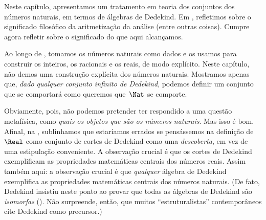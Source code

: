 \documentclass[../../../include/open-logic-section]{subfiles}
\begin{document}


Neste capítulo, apresentamos um tratamento em teoria dos conjuntos dos
números naturais, em termos de álgebras de Dedekind. Em
, refletimos sobre o significado filosófico
da aritmetização da análise (entre outras coisas).
Cumpre agora refletir sobre o significado do que aqui alcançamos.

Ao longo de , tomamos os números naturais como
dados e os usamos para construir os inteiros, os racionais e os reais,
de modo explícito. Neste capítulo, não demos uma construção explícita
dos números naturais. Mostramos apenas que,
\emph{dado qualquer conjunto infinito de Dedekind}, podemos definir um conjunto que se
comportará como queremos que~$\Nat$ se comporte.

Obviamente, pois, não podemos pretender ter respondido a uma questão
metafísica, como \emph{quais os objetos que são os números naturais}. Mas
isso é bom. Afinal, na , sublinhamos que
estaríamos errados se pensássemos na definição de
$\Real$ como conjunto de cortes de Dedekind como uma \emph{descoberta}, em vez de
uma estipulação conveniente. A observação crucial é que os cortes de Dedekind
exemplificam as propriedades matemáticas centrais dos números reais.
Assim também aqui: a observação crucial é que \emph{qualquer}
álgebra de Dedekind exemplifica as propriedades matemáticas centrais dos
números naturais. (De fato, Dedekind insistiu neste ponto ao provar
que todas as álgebras de Dedekind são \emph{isomorfas} (\citeyear[Theorems
132--3]{Dedekind1888}). Não surpreende, então, que muitos
``estruturalistas'' contemporâneos cite Dedekind como precursor.)
\end{document}
